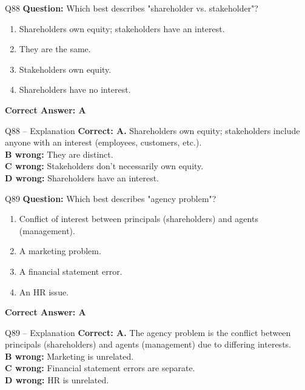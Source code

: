 \documentclass[aspectratio=169,10pt]{beamer}
\begin{document}
	\begin{frame}[t]{Q88}
		\small
		\textbf{Question:} Which best describes "shareholder vs. stakeholder"?
		\begin{enumerate}[label=\Alph*.,itemsep=1pt,topsep=2pt]
			\item Shareholders own equity; stakeholders have an interest.
			\item They are the same.
			\item Stakeholders own equity.
			\item Shareholders have no interest.
		\end{enumerate}
		\vspace{4pt}
		\textbf{Correct Answer: A}
	\end{frame}
	
	\begin{frame}[t]{Q88 -- Explanation}
		\small
		\textbf{Correct: A.} Shareholders own equity; stakeholders include anyone with an interest (employees, customers, etc.). \\[4pt]
		\textbf{B wrong:} They are distinct. \\[2pt]
		\textbf{C wrong:} Stakeholders don't necessarily own equity. \\[2pt]
		\textbf{D wrong:} Shareholders have an interest.
	\end{frame}
	
	\begin{frame}[t]{Q89}
		\small
		\textbf{Question:} Which best describes "agency problem"?
		\begin{enumerate}[label=\Alph*.,itemsep=1pt,topsep=2pt]
			\item Conflict of interest between principals (shareholders) and agents (management).
			\item A marketing problem.
			\item A financial statement error.
			\item An HR issue.
		\end{enumerate}
		\vspace{4pt}
		\textbf{Correct Answer: A}
	\end{frame}
	
	\begin{frame}[t]{Q89 -- Explanation}
		\small
		\textbf{Correct: A.} The agency problem is the conflict between principals (shareholders) and agents (management) due to differing interests. \\[4pt]
		\textbf{B wrong:} Marketing is unrelated. \\[2pt]
		\textbf{C wrong:} Financial statement errors are separate. \\[2pt]
		\textbf{D wrong:} HR is unrelated.
	\end{frame}
	
\end{document}

